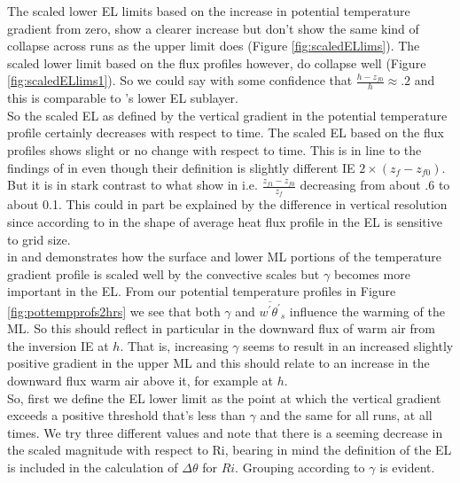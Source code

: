 The scaled lower \acs{EL} limits based on the increase in potential temperature gradient from zero, show a clearer increase but don't show the same kind of collapse across runs as the upper limit does (Figure \ref{fig:scaledELlims}).  The scaled lower limit based on the flux profiles however, do collapse well (Figure \ref{fig:scaledELlims1}).  So we could say with some confidence that $\frac{h-z_{f0}}{h} \approx .2$ and this is comparable to \citeauthor{GarciaMellado}'s lower \acs{EL} sublayer.\\
  
So the scaled \acs{EL} as defined by the vertical gradient in the potential temperature profile certainly decreases with respect to time.  The scaled \acs{EL} based on the flux profiles shows slight or no change with respect to time.  This is in line to the findings of \citeauthor{BrooksFowler2} in \cite{BrooksFowler2} even though their definition is slightly different IE $2 \times (z_{f}-z_{f0})$.  But it is in stark contrast to what \citeauthor{FedConzMir04} show in \cite{FedConzMir04} i.e. $\frac{z_{f1}-z_{f0}}{z_{f}}$ decreasing from about .6 to about 0.1.  This could in part be explained by the difference in vertical resolution since according to \citeauthor{SullPat} in \cite{SullPat} the shape of average heat flux profile in the \acs{EL} is sensitive to grid size.\\

\citeauthor{Sorbjan} in \cite{Sorbjan} and \cite{Sorbjan1} demonstrates how the surface and lower \acs{ML} portions of the temperature gradient profile is scaled well by the convective scales but $\gamma$ becomes more important in the \acs{EL}.  From our potential temperature profiles in Figure \ref{fig:pottempprofs2hrs} we see that both $\gamma$ and $\overline{w^{'}\theta^{'}}_{s}$ influence the warming of the \acs{ML}. So this should reflect in particular in the downward flux of warm air from the inversion IE at $h$. That is, increasing $\gamma$ seems to result in an increased slightly positive gradient in the upper \acs{ML} and this should relate to an increase in the downward flux warm air above it, for example at $h$.\\

So, first we define the \acs{EL} lower limit as the point at which the vertical gradient exceeds a positive threshold that's less than $\gamma$ and the same for all runs, at all times. We try three different values and note that there is a seeming decrease in the scaled magnitude with respect to \acs{Ri}, bearing in mind the definition of the \acs{EL} is included in the calculation of $\Delta \theta$ for $Ri$. Grouping according to $\gamma$ is evident.\\

